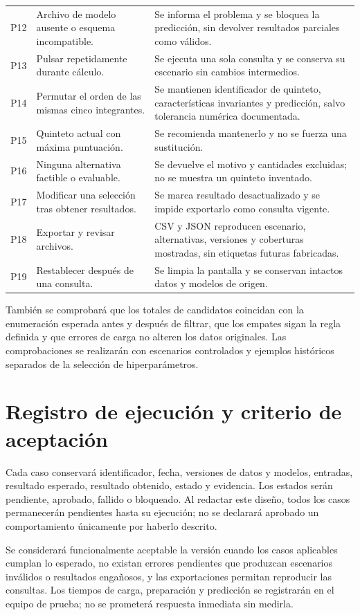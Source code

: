 \begin{longtable}{@{}>{\raggedright\arraybackslash}p{1.1cm}>{\raggedright\arraybackslash}p{4.7cm}>{\raggedright\arraybackslash}p{8.8cm}@{}}
P12 & Archivo de modelo ausente o esquema incompatible. & Se informa el problema y se bloquea la predicción, sin devolver resultados parciales como válidos.\\
P13 & Pulsar repetidamente durante cálculo. & Se ejecuta una sola consulta y se conserva su escenario sin cambios intermedios.\\
P14 & Permutar el orden de las mismas cinco integrantes. & Se mantienen identificador de quinteto, características invariantes y predicción, salvo tolerancia numérica documentada.\\
P15 & Quinteto actual con máxima puntuación. & Se recomienda mantenerlo y no se fuerza una sustitución.\\
P16 & Ninguna alternativa factible o evaluable. & Se devuelve el motivo y cantidades excluidas; no se muestra un quinteto inventado.\\
P17 & Modificar una selección tras obtener resultados. & Se marca resultado desactualizado y se impide exportarlo como consulta vigente.\\
P18 & Exportar y revisar archivos. & CSV y JSON reproducen escenario, alternativas, versiones y coberturas mostradas, sin etiquetas futuras fabricadas.\\
P19 & Restablecer después de una consulta. & Se limpia la pantalla y se conservan intactos datos y modelos de origen.\\
\end{longtable}\endgroup

También se comprobará que los totales de candidatos coincidan con la enumeración esperada antes y después de filtrar, que los empates sigan la regla definida y que errores de carga no alteren los datos originales. Las comprobaciones se realizarán con escenarios controlados y ejemplos históricos separados de la selección de hiperparámetros.

\section{Registro de ejecución y criterio de aceptación}
\label{sec:registro-pruebas-demostrador}
Cada caso conservará identificador, fecha, versiones de datos y modelos, entradas, resultado esperado, resultado obtenido, estado y evidencia. Los estados serán pendiente, aprobado, fallido o bloqueado. Al redactar este diseño, todos los casos permanecerán pendientes hasta su ejecución; no se declarará aprobado un comportamiento únicamente por haberlo descrito.

Se considerará funcionalmente aceptable la versión cuando los casos aplicables cumplan lo esperado, no existan errores pendientes que produzcan escenarios inválidos o resultados engañosos, y las exportaciones permitan reproducir las consultas. Los tiempos de carga, preparación y predicción se registrarán en el equipo de prueba; no se prometerá respuesta inmediata sin medirla.

